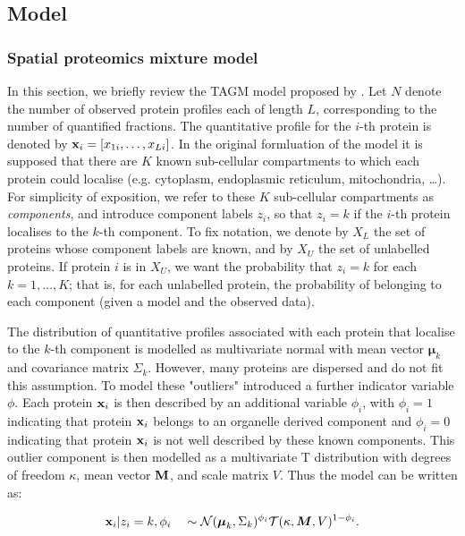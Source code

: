\documentclass[12pt,english]{article}
\begin{document}
\subsection{Model}
\subsubsection{Spatial proteomics mixture model}
In this section, we briefly review the TAGM model proposed by \citep{Crook:2018}. Let $N$ denote the number of observed protein profiles each of length $L$, corresponding to
the number of quantified fractions. The quantitative profile for the $i$-th protein is denoted by ${\bf x}_i = [x_{1i}, \ldots, x_{Li}]$.  In the original formluation of the model it is supposed that there are $K$
known sub-cellular compartments to which each protein could localise
(e.g. cytoplasm, endoplasmic reticulum, mitochondria, \ldots). For simplicity of exposition, we refer to these $K$ sub-cellular compartments as {\em
	components}, and introduce component labels $z_i$, so that $z_i = k$
if the $i$-th protein localises to the $k$-th component. To fix notation, we denote by
$X_L$ the set of proteins whose component labels are known, and by
$X_U$ the set of unlabelled proteins.  If protein $i$ is in $X_U$, we
want the probability that $z_i = k$ for each $k = 1, \ldots, K$;
that is, for each unlabelled protein, the probability of
belonging to each component (given a model and the observed data).


The distribution of quantitative profiles associated with each
protein that localise to the $k$-th component is modelled as multivariate normal
with mean vector $\boldsymbol{\mu}_k$ and covariance matrix
$\Sigma_k$. However, many proteins are dispersed and do not fit this assumption. To model these "outliers" \cite{Crook:2018} introduced a further indicator variable $\phi$. Each protein ${\bf x}_i$ is then described by an additional variable $\phi_i$, with $\phi_i = 1$ indicating that protein ${\bf x}_i$ belongs to an
organelle derived component and $\phi_i = 0$ indicating that protein
${\bf x}_i$ is not well described by these known components. This
outlier component is then modelled as a multivariate T distribution with
degrees of freedom $\kappa$, mean vector $\bf{M}$, and scale matrix
$V$. Thus the model can be written as:

\begin{align}
{\bf x}_i | z_i = k, \phi_i \quad \sim \mathcal{N}(\boldsymbol{\mu}_k, \Sigma_k)^{\phi_i}\mathcal{T}(\kappa, \boldsymbol{M}, V)^{1 - \phi_i }.
\end{align}
\end{document}
